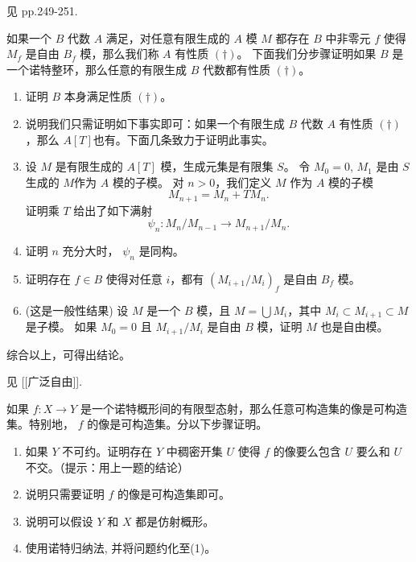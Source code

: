 见 \cite{GoWe20} pp.249-251.

\begin{exercise}[Grothendieck一般点自由引理]
    如果一个 $B$ 代数 $A$ 满足，对任意有限生成的 $A$ 模 $M$ 都存在 $B$ 中非零元 $f$ 使得 $M_{f}$ 是自由 $B_{f}$ 模，那么我们称 $A$ 有性质 $(\dagger)$。
    下面我们分步骤证明如果 $B$ 是一个诺特整环，那么任意的有限生成 $B$ 代数都有性质 $(\dagger)$。
    \begin{enumerate}  
        \item 证明 $B$ 本身满足性质 $(\dagger)$。
        \item 说明我们只需证明如下事实即可：如果一个有限生成 $B$ 代数 $A$ 有性质 $(\dagger)$，那么 $A[T]$也有。下面几条致力于证明此事实。
        \item 设 $M$ 是有限生成的 $A[T]$ 模，生成元集是有限集 $S$。
        令 $M_{0}=0$, $M_{1}$ 是由 $S$ 生成的 $M$作为 $A$ 模的子模。
        对 $n>0$，我们定义 $M$ 作为 $A$ 模的子模
        $$M_{n+1}=M_{n}+T M_{n}.$$
        证明乘 $T$ 给出了如下满射
        $$\psi_{n}: M_{n} / M_{n-1} \rightarrow M_{n+1} / M_{n}.$$
        \item 证明 $n$ 充分大时， $\psi_{n}$ 是同构。
        \item 证明存在 $f \in B$ 使得对任意 $i$，都有 $\left(M_{i+1} / M_{i}\right)_{f}$ 是自由 $B_{f}$ 模。
        \item (这是一般性结果) 设 $M$ 是一个 $B$ 模，且 $M=\bigcup M_{i}$，其中 $M_{i} \subset M_{i+1} \subset M$ 是子模。
        如果 $M_{0}=0$ 且 $M_{i+1} / M_{i}$ 是自由 $B$ 模，证明 $M$ 也是自由模。
    \end{enumerate}
    综合以上，可得出结论。
\end{exercise}

见 [[广泛自由]].


\begin{exercise}[Chevalley定理]
    如果 $f: X \rightarrow Y$ 是一个诺特概形间的有限型态射，那么任意可构造集的像是可构造集。特别地， $f$ 的像是可构造集。分以下步骤证明。

    \begin{enumerate}
        \item 如果 $Y$ 不可约。证明存在 $Y$ 中稠密开集 $U$ 使得 $f$ 的像要么包含 $U$ 要么和 $U$ 不交。（提示：用上一题的结论）
        \item 说明只需要证明 $f$ 的像是可构造集即可。
        \item 说明可以假设 $Y$ 和 $X$ 都是仿射概形。
        \item 使用诺特归纳法, 并将问题约化至(1)。
    \end{enumerate}
\end{exercise}


